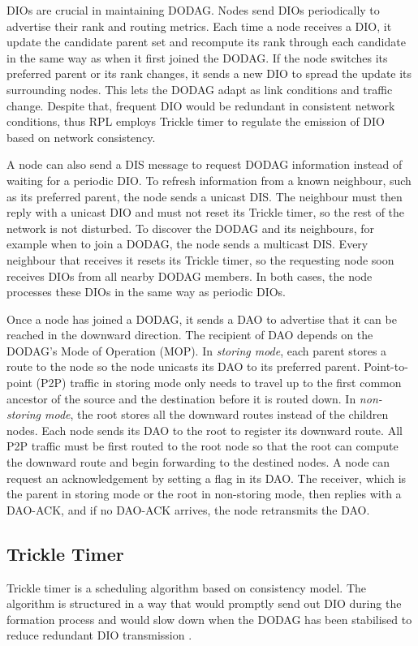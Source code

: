 DIOs are crucial in maintaining DODAG. Nodes send DIOs periodically to
advertise their rank and routing metrics. Each time a node receives a
DIO, it update the candidate parent set and
recompute its rank through each candidate in the same way as when it
first joined the DODAG. If the node switches its
preferred parent or its rank changes, it sends a new DIO to spread
the update its surrounding nodes. This lets the DODAG adapt as link
conditions and traffic change.
Despite that, frequent DIO would be redundant in consistent network
conditions, thus RPL employs Trickle timer to regulate the emission
of DIO based on network consistency.

A node can also send a DIS message to request DODAG information instead
of waiting for a periodic DIO. To refresh information from a
known neighbour, such as its preferred parent, the node sends a unicast
DIS. The neighbour must then reply with a unicast DIO and must not reset
its Trickle timer, so the rest of the network is not disturbed. To
discover the DODAG and its neighbours, for example when to join a DODAG, the
node sends a multicast DIS. Every neighbour that receives it
resets its Trickle timer, so the requesting node soon receives DIOs from all
nearby DODAG members. In both cases, the node processes these DIOs in
the same way as periodic DIOs.

Once a node has joined a DODAG, it sends a DAO to advertise that it
can be reached in the downward direction. The recipient of DAO
depends on the DODAG's Mode of Operation (MOP). In \emph{storing
mode}, each parent stores a route to the node so the node unicasts
its DAO to its preferred parent. Point-to-point (P2P) traffic in
storing mode only needs to travel up to the first common ancestor of
the source and the
destination before it is routed down. In \emph{non-storing mode}, the
root stores all the downward routes instead of the children nodes.
Each node sends its DAO to the root to register its downward route.
All P2P traffic must be first routed to the root node so that the
root can compute the downward route and begin forwarding to the destined nodes.
A node can request an acknowledgement by setting a flag in its DAO. The
receiver, which is the parent in storing mode or the root in
non-storing mode, then replies with a DAO-ACK, and if no DAO-ACK
arrives, the node retransmits the DAO.

\subsection{Trickle Timer}
Trickle timer is a scheduling algorithm based on consistency model.
The algorithm is structured in a way that would promptly send out DIO
during the formation process and would slow down when the DODAG has
been stabilised to reduce redundant DIO transmission \cite{rfc6206}.

